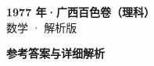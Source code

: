 \documentclass[zihao=-4, a4paper]{ctexart}
\begin{document}
\begin{center}
  {\Large\bfseries 1977 年·广西百色卷（理科）}\\[4pt]
  {\large 数学 · 解析版}
\end{center}
\medskip
{}

\clearpage
{}
\begin{center}{\Large\bfseries 参考答案与详细解析}\end{center}
\medskip

\end{document}
